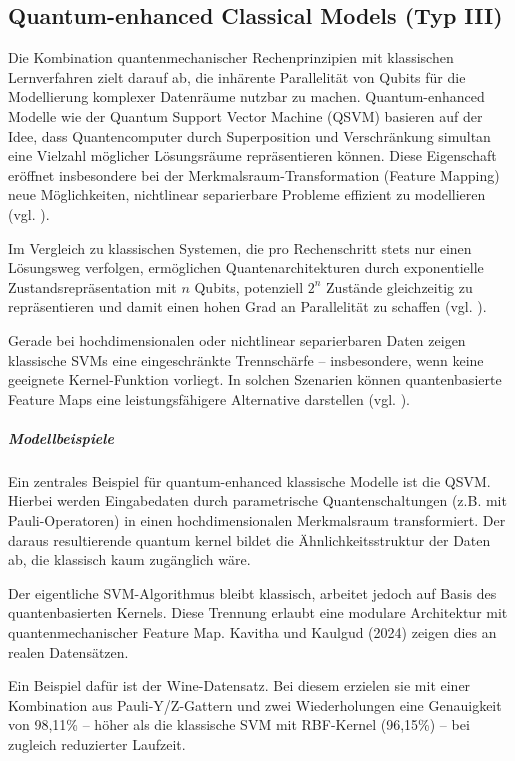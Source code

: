\subsection{Quantum-enhanced Classical Models (Typ III)}
Die Kombination quantenmechanischer Rechenprinzipien mit klassischen Lernverfahren zielt darauf ab, die inhärente Parallelität von Qubits für die Modellierung komplexer Datenräume nutzbar zu machen. Quantum-enhanced Modelle wie der Quantum Support Vector Machine (QSVM) basieren auf der Idee, dass Quantencomputer durch Superposition und Verschränkung simultan eine Vielzahl möglicher Lösungsräume repräsentieren können. Diese Eigenschaft eröffnet insbesondere bei der Merkmalsraum-Transformation (Feature Mapping) neue Möglichkeiten, nichtlinear separierbare Probleme effizient zu modellieren (vgl. \cite{kavithaQuantumMachineLearning2024}).

Im Vergleich zu klassischen Systemen, die pro Rechenschritt stets nur einen Lösungsweg verfolgen, ermöglichen Quantenarchitekturen durch exponentielle Zustandsrepräsentation mit \( n \) Qubits, potenziell \( 2^n \) Zustände gleichzeitig zu repräsentieren und damit einen hohen Grad an Parallelität zu schaffen (vgl. \cite{gujjuQuantumMachineLearning2024}).

Gerade bei hochdimensionalen oder nichtlinear separierbaren Daten zeigen klassische SVMs eine eingeschränkte Trennschärfe – insbesondere, wenn keine geeignete Kernel-Funktion vorliegt. In solchen Szenarien können quantenbasierte Feature Maps eine leistungsfähigere Alternative 
darstellen (vgl. \cite{peral-garciaSystematicLiteratureReview2024}).


\subparagraph{Modellbeispiele}
Ein zentrales Beispiel für quantum-enhanced klassische Modelle ist die QSVM. Hierbei werden Eingabedaten durch parametrische Quantenschaltungen (z.B. mit Pauli-Operatoren) in einen hochdimensionalen Merkmalsraum transformiert. Der daraus resultierende quantum kernel bildet die Ähnlichkeitsstruktur der Daten ab, die klassisch kaum zugänglich wäre. 

Der eigentliche SVM-Algorithmus bleibt klassisch, arbeitet jedoch auf Basis des quantenbasierten Kernels. Diese Trennung erlaubt eine modulare Architektur mit quantenmechanischer Feature Map.
Kavitha und Kaulgud (2024) zeigen dies an realen Datensätzen.


Ein Beispiel dafür ist der Wine-Datensatz. Bei diesem erzielen sie mit einer Kombination aus Pauli-Y/Z-Gattern und zwei Wiederholungen eine Genauigkeit von 98{,}11\% – höher als die klassische SVM mit RBF-Kernel (96{,}15\%) – bei zugleich reduzierter Laufzeit.

